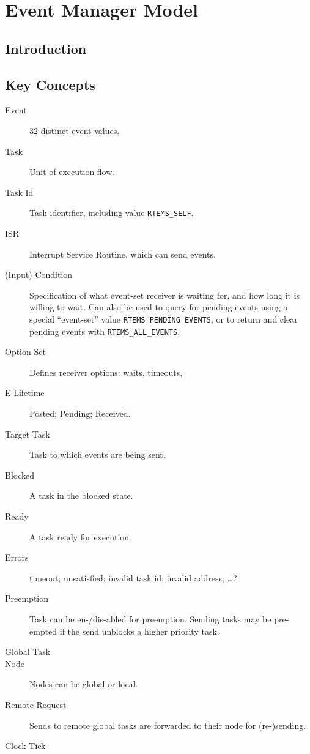 \chapter{Event Manager Model}

\section{Introduction}

\section{Key Concepts}

\begin{description}
  \item [Event] 32 distinct event values.
  \item [Task]  Unit of execution flow.
  \item [Task Id]  Task identifier,
   including value \texttt{RTEMS\_SELF}.
  \item [ISR] Interrupt Service Routine, which can send events.
  \item [(Input) Condition]
    Specification of what event-set receiver is waiting for,
    and how long it is willing to wait.
    Can also be used to query for pending events using
    a special ``event-set'' value
     \texttt{RTEMS\_PENDING\_EVENTS},
     or to return and clear pending events with
     \texttt{RTEMS\_ALL\_EVENTS}.
  \item[Option Set]
     Defines receiver options: waits, timeouts,
  \item [E-Lifetime] Posted; Pending; Received.
  \item [Target Task] Task to which events are being sent.
  \item [Blocked] A task in the blocked state.
  \item [Ready] A task ready for execution.
  \item [Errors]
     timeout;
     unsatisfied;
     invalid task id;
     invalid address;
     \dots?
  \item[Preemption]
    Task can be en-/dis-abled for preemption.
    Sending tasks may be pre-empted if the send unblocks a
    higher priority task.
  \item[Global Task]
  \item[Node] Nodes can be global or local.
  \item[Remote Request] Sends to remote global tasks
  are forwarded to their node for (re-)sending.
  \item[Clock Tick]
\end{description}

